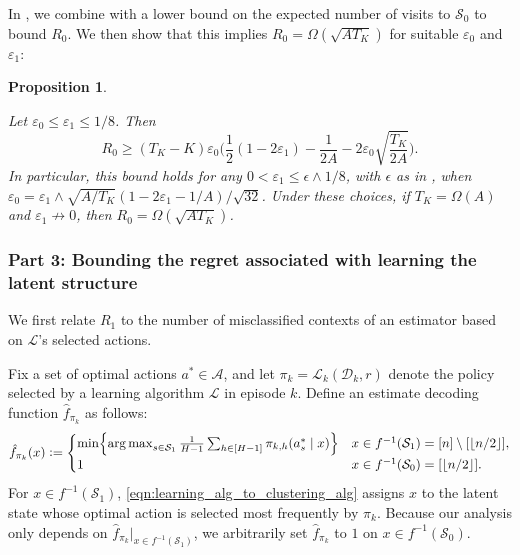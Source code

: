 \documentclass[11pt]{article}
\newcommand{\eqdef}{\vcentcolon=}
\newcommand{\mcA}{\mathcal{A}}
\newcommand{\mcD}{\mathcal{D}}
\newcommand{\mcL}{\mathcal{L}}
\newcommand{\mcS}{\mathcal{S}}
\DeclareMathOperator*{\argmax}{arg\,max}
\DeclarePairedDelimiter\floor{\lfloor}{\rfloor}
\newtheorem{proposition}[theorem]{Proposition}
\theoremstyle{definition}
\theoremstyle{definition}
\begin{document}
In , we combine  with a lower bound on the expected number of visits to $\mcS_0$ to bound $R_0$.
We then show that this implies $R_0=\Omega(\sqrt{AT_K})$ for suitable $\varepsilon_0$ and $\varepsilon_1$:
\begin{proposition}
	\label{prop:transition_regret_lower_bound}

	Let $\varepsilon_0\leq \varepsilon_1 \leq 1/8$.
	Then
	\begin{equation}
		R_0
		\geq
		(T_K-K)\varepsilon_0
		\biggl(
		\frac{1}{2}(1-2\varepsilon_1)
		-
		\frac{1}{2A}
		-
		2\varepsilon_0\sqrt{ \frac{T_K}{2A}}
		\biggr)
		.
		\label{eqn:transition_regret_lower_bound}
	\end{equation}
	In particular, this bound holds for any $0<\varepsilon_1\leq \epsilon\wedge 1/8$, with $\epsilon$ as in , when $\varepsilon_0 = \varepsilon_1 \wedge \sqrt{A/T_K}(1-2\varepsilon_1-1/A)/\sqrt{32}$.
	Under these choices, if $T_K=\Omega(A)$ and $\varepsilon_1 \not\rightarrow 0$, then $R_0=\Omega(\sqrt{AT_K})$.
\end{proposition}

\subsubsection*{Part 3: Bounding the regret associated with learning the latent structure}

We first relate $R_1$ to the number of misclassified contexts of an estimator based on $\mcL$'s selected actions.

Fix a set of optimal actions $a^*\in\mcA$, and let $\pi_k=\mcL_k(\mcD_k,r)$ denote the policy selected by a learning algorithm $\mcL$ in episode $k$.
Define an estimate decoding function $\hat{f}_{\pi_k}$ as follows:
\begin{equation}
	\label{eqn:learning_alg_to_clustering_alg}
	\hat{f}_{\pi_k}(x)
	\eqdef
	\begin{cases}
		\min
		\Bigl\{
		\argmax_{s \in \mcS_1}
		\frac{1}{H-1}
		\sum_{h\in[H-1]}
		\pi_{k,h}(a_s^*\mid x)
		\Bigr\}
		 &
		x \in f^{-1}(\mcS_1) = [n] \setminus [\floor{n/2}]
		,
		\\
		1
		 &
		x \in f^{-1}(\mcS_0) = [\floor{n/2}]
		.
	\end{cases}
\end{equation}
For $x \in f^{-1}(\mcS_1)$, \eqref{eqn:learning_alg_to_clustering_alg} assigns $x$ to the latent state whose optimal action is selected most frequently by $\pi_k$.
Because our analysis only depends on $\hat{f}_{\pi_k}|_{x \in f^{-1}(\mcS_1)}$, we arbitrarily set $\hat{f}_{\pi_k}$ to $1$ on $x \in f^{-1}(\mcS_0)$.
\end{document}
